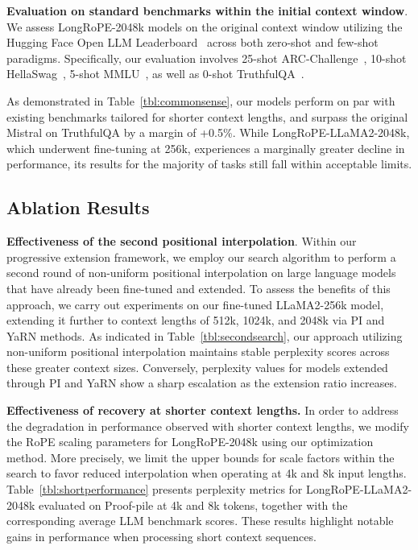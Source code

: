 \textbf{Evaluation on standard benchmarks within the initial context window}. We assess LongRoPE-2048k models on the original context window utilizing the Hugging Face Open LLM Leaderboard~\cite{huggingfaceboard} across both zero-shot and few-shot paradigms. Specifically, our evaluation involves 25-shot ARC-Challenge~\cite{allenai:arc}, 10-shot HellaSwag~\cite{zellers2019hellaswag}, 5-shot MMLU~\cite{mmlu}, as well as 0-shot TruthfulQA~\cite{lin2021truthfulqa}.

As demonstrated in Table~\ref{tbl:commonsense}, our models perform on par with existing benchmarks tailored for shorter context lengths, and surpass the original Mistral on TruthfulQA by a margin of +0.5\%. While LongRoPE-LLaMA2-2048k, which underwent fine-tuning at 256k, experiences a marginally greater decline in performance, its results for the majority of tasks still fall within acceptable limits.

\subsection{Ablation Results}

\textbf{Effectiveness of the second positional interpolation}. Within our progressive extension framework, we employ our search algorithm to perform a second round of non-uniform positional interpolation on large language models that have already been fine-tuned and extended. To assess the benefits of this approach, we carry out experiments on our fine-tuned LLaMA2-256k model, extending it further to context lengths of 512k, 1024k, and 2048k via PI and YaRN methods. As indicated in Table~\ref{tbl:secondsearch}, our approach utilizing non-uniform positional interpolation maintains stable perplexity scores across these greater context sizes. Conversely, perplexity values for models extended through PI and YaRN show a sharp escalation as the extension ratio increases.

\textbf{Effectiveness of recovery at shorter context lengths.} In order to address the degradation in performance observed with shorter context lengths, we modify the RoPE scaling parameters for LongRoPE-2048k using our optimization method. More precisely, we limit the upper bounds for scale factors within the search to favor reduced interpolation when operating at 4k and 8k input lengths. Table~\ref{tbl:shortperformance} presents perplexity metrics for LongRoPE-LLaMA2-2048k evaluated on Proof-pile at 4k and 8k tokens, together with the corresponding average LLM benchmark scores. These results highlight notable gains in performance when processing short context sequences.

